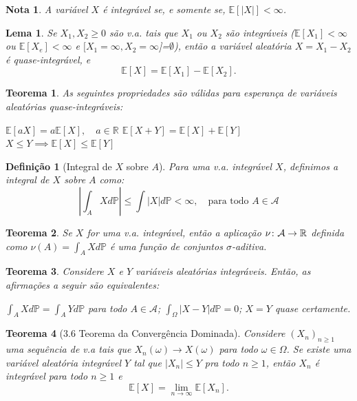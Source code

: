 \documentclass[12pt,a4paper,answers]{article}
\numberwithin{equation}{section} %
\renewcommand{\Re}{\mathbb{R}}
\renewcommand{\P}{\mathbb{P}}
\newcommand{\E}{\mathbb{E}}
\newcommand{\Acal}{\mathcal{A}}
\newcommand{\sig}{$\sigma$}
\theoremstyle{thm_estilo}
\newtheorem{theorem}{Teorema}[section]
\newtheorem{definition}{Definição}[section]
\newtheorem{lemma}{Lema}[section]
\theoremstyle{thm_note_est}
\newtheorem*{note}{Nota}
\begin{document}
\begin{note}
	A variável $X$ é integrável se, e somente se, $\E[|X|]<\infty$.
\end{note}

\begin{lemma}
	Se $X_1,X_2\geq0$ são v.a. tais que $X_1$ ou $X_2$ são integráveis ($\E[X_1]<\infty$ ou $\E[X_e]<\infty$ e $[X_1=\infty, X_2=\infty$]=$\emptyset$), então a variável aleatória $X = X_1-X_2$ é quase-integrável, e
	\[
	\E[X] = \E[X_1] - \E[X_2].
	\]
\end{lemma}

\begin{theorem}
	As seguintes propriedades são válidas para esperança de variáveis aleatórias quase-integráveis:
	\begin{outline}[enumerate]
		\1 \(\E[aX] = a\E[X], \quad a\in \Re\)
		\1 \(\E[X+Y] = \E[X] + \E[Y]\)
		\1 \(X\leq Y \implies \E[X]\leq\E[Y]\)
	\end{outline}
\end{theorem}

\begin{definition}[Integral de $X$ sobre $A$]
	Para uma v.a. integrável $X$, definimos a integral de $X$ sobre $A$ como:
	\begin{equation}
		\left| \int_A X d\P \right| \leq \int |X| d\P < \infty, \quad \text{para todo } A\in\Acal
	\end{equation}
\end{definition}

\begin{theorem}
	Se $X$ for uma v.a. integrável, então a aplicação \(\mathmbox{\nu\colon \Acal \to \Re}\) definida como \(\nu(A) = \int_A X d\P\) é uma função de conjuntos \sig-aditiva.
\end{theorem}

\begin{theorem}
	Considere $X$ e $Y$ variáveis aleatórias integráveis. Então, as afirmações a seguir são equivalentes:
	\begin{outline}[enumerate]
		\1 \( \int_A X d\P = \int_A Y d\P\) para todo $A\in\Acal$;
		\1 \( \int_{\Omega} |X-Y| d\P = 0\);
		\1 $X=Y$ quase certamente.
	\end{outline}
\end{theorem}

\begin{theorem}[3.6 Teorema da Convergência Dominada]
	Considere $(X_n)_{n\geq1}$ uma sequência de v.a tais que \(X_n(\omega)\to X(\omega)\) para todo $\omega\in\Omega$. Se existe uma variável aleatória integrável $Y$ tal que $|X_n|\leq Y$ pra todo $n\geq1$, então $X_n$ é integrável para todo $n\geq1$ e
	\[
		\E[X] = \lim\limits_{n\to\infty}\E[X_n].
	\]
\end{theorem}
\end{document}
